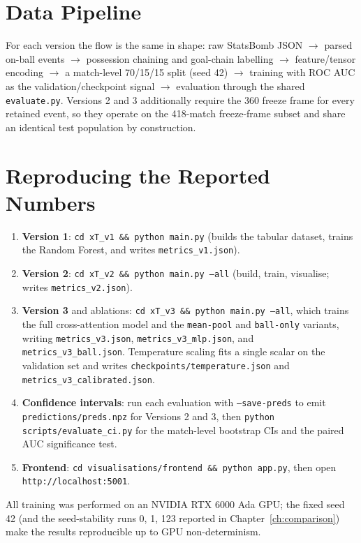 \section{Data Pipeline}

For each version the flow is the same in shape: raw StatsBomb JSON $\to$ parsed on-ball events $\to$ possession chaining and goal-chain labelling $\to$ feature/tensor encoding $\to$ a match-level 70/15/15 split (seed 42) $\to$ training with ROC AUC as the validation/checkpoint signal $\to$ evaluation through the shared \texttt{evaluate.py}. Versions 2 and 3 additionally require the 360 freeze frame for every retained event, so they operate on the 418-match freeze-frame subset and share an identical test population by construction.

\section{Reproducing the Reported Numbers}

\begin{enumerate}
    \item \textbf{Version 1}: \texttt{cd xT\_v1 \&\& python main.py} (builds the tabular dataset, trains the Random Forest, and writes \texttt{metrics\_v1.json}).
    \item \textbf{Version 2}: \texttt{cd xT\_v2 \&\& python main.py --all} (build, train, visualise; writes \texttt{metrics\_v2.json}).
    \item \textbf{Version 3} and ablations: \texttt{cd xT\_v3 \&\& python main.py --all}, which trains the full cross-attention model and the \texttt{mean-pool} and \texttt{ball-only} variants, writing \texttt{metrics\_v3.json}, \texttt{metrics\_v3\_mlp.json}, and \texttt{metrics\_v3\_ball.json}. Temperature scaling fits a single scalar on the validation set and writes \texttt{checkpoints/temperature.json} and \texttt{metrics\_v3\_calibrated.json}.
    \item \textbf{Confidence intervals}: run each evaluation with \texttt{--save-preds} to emit \texttt{predictions/preds.npz} for Versions 2 and 3, then \texttt{python scripts/evaluate\_ci.py} for the match-level bootstrap CIs and the paired AUC significance test.
    \item \textbf{Frontend}: \texttt{cd visualisations/frontend \&\& python app.py}, then open \texttt{http://localhost:5001}.
\end{enumerate}

All training was performed on an NVIDIA RTX 6000 Ada GPU; the fixed seed 42 (and the seed-stability runs 0, 1, 123 reported in Chapter~\ref{ch:comparison}) make the results reproducible up to GPU non-determinism.
